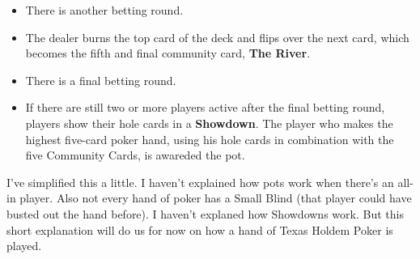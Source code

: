 \begin{itemize}
\item There is another betting round.

\item The dealer burns the top card of the deck and flips over the
  next card, which becomes the fifth and final community card, \textbf{The
    River}.

\item There is a final betting round.

\item If there are still two or more players active after the final
  betting round, players show their hole cards in a \textbf{Showdown}.
  The player who makes the highest five-card poker hand, using his
  hole cards in combination with the five Community Cards, is awareded
  the pot.

\end{itemize}

I've simplified this a little. I haven't explained how pots work when
there's an all-in player. Also not every hand of poker has a Small Blind
(that player could have busted out the hand before). I haven't
explaned how Showdowns work. But this short explanation will do us for
now on how a hand of Texas Holdem Poker is played.
